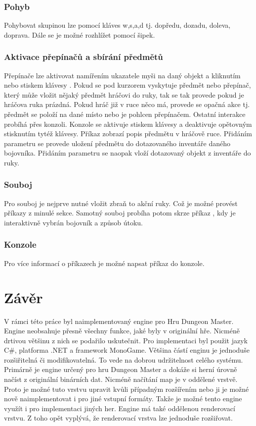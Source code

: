 \subsection{Pohyb}
Pohybovat skupinou lze pomocí kláves w,s,a,d tj. dopředu, dozadu, doleva, doprava. Dále se je možné rozhlížet pomocí šipek.

\subsection{Aktivace přepínačů a sbírání předmětů}
Přepínače lze aktivovat namířením ukazatele myši na daný objekt a kliknutím nebo stiskem klávesy . Pokud
se pod kurzorem vyskytuje předmět nebo  přepínač, který může vložit nějaký předmět hráčovi do ruky, tak se tak provede pokud je
hráčova ruka prázdná. Pokud hráč již v ruce něco má, provede se opačná akce tj. předmět se položí na dané místo nebo je 
pohlcen přepínačem. Ostatní interakce probíhá přes konzoli. Konzole se aktivuje stiskem klávesy  a deaktivuje opětovným
stisknutím tytéž klávesy. Příkaz  zobrazí popis předmětu v hráčově ruce. Přidáním parametru  se provede
uložení předmětu do dotazovaného inventáře daného bojovníka. Přidáním parametru  se naopak vloží dotazovaný objekt z inventáře
do ruky.

\subsection{Souboj}
Pro souboj je nejprve nutné vložit zbraň to akční ruky. Což je možné provést příkazy z minulé sekce.
Samotný souboj probíha potom skrze příkaz , kdy je interaktivně vybrán bojovník a způsob útoku.

\subsection{Konzole}
Pro více informací o příkazech je možné napsat příkaz  do konzole.

\chapter*{Závěr}

V rámci této práce byl naimplementovaný engine pro Hru Dungeon Master. Engine 
neobsahuje přesně všechny funkce, jaké byly v originální hře. Nicméně drtivou většinu
z nich se podařilo uskutečnit. Pro implementaci byl použit jazyk C\#, platforma .NET
a framework MonoGame. Většina částí enginu je jednoduše rozšiřitelná či modifikovatelná.
To vede na dobrou udržitelnost celého systému. Primárně je engine určený pro hru 
Dungeon Master a dokáže si herní úrovně načíst z originální binárních dat. Nicméně
načítání map je v oddělené vrstvě. Proto je možné tuto vrstvu upravit kvůli případným rozšířením nebo ji je možné
 nově naimplementovat i pro 
jiné vstupní formáty. Takže je možné tento engine využít i pro implementaci jiných her.
Engine má také oddělenou renderovací vrstvu. Z toho opět vyplývá, že renderovací vrstva lze jednoduše
rozšiřovat.



